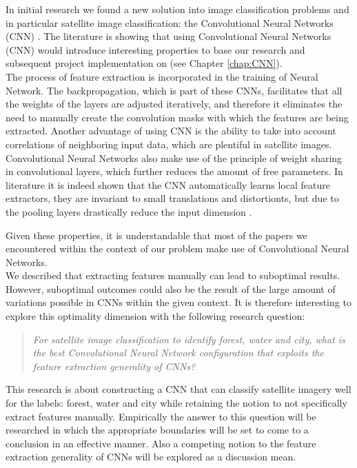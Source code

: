\documentclass[a4paper,onecolumn]{report}
\begin{document}
In initial research we found a new solution into image classification problems and in particular satellite image classification: the Convolutional Neural Networks (CNN) \cite{Hongsheng2014} \cite{Farabet2013}. The literature is showing that using Convolutional Neural Networks (CNN) would introduce interesting properties to base our research and subsequent project implementation on (see Chapter \ref{chap:CNN}).\\

The process of feature extraction is incorporated in the training of Neural Network. The backpropagation, which is part of these CNNs, facilitates that all the weights of the layers are adjusted iteratively, and therefore it eliminates the need to manually create the convolution masks with which the features are being extracted. Another advantage of using CNN is the ability to take into account correlations of neighboring input data, which are plentiful in satellite images. Convolutional Neural Networks also make use of the principle of weight sharing in convolutional layers, which further reduces the amount of free parameters. In literature it is indeed shown that the CNN automatically learns local feature extractors, they are invariant to small translations and distortionts, but due to the pooling layers drastically reduce the input dimension \cite{duffner2008face}.

Given these properties, it is understandable that most of the papers we encountered within the context of our problem make use of Convolutional Neural Networks.\\

We described that extracting features manually can lead to suboptimal results. However, suboptimal outcomes could also be the result of the large amount of variations possible in CNNs within the given context. It is therefore interesting to explore this optimality dimension with the following research question:

\begin{quote}
\emph{ \hspace{2ex} For satellite image classification to identify forest, water and city, what is the best Convolutional Neural Network configuration that exploits the feature extraction generality of CNNs?}
\end{quote}

This research is about constructing a CNN that can classify satellite imagery well for the labels: forest, water and city while retaining the notion to not specifically extract features manually. Empirically the answer to this question will be researched in which the appropriate boundaries will be set to come to a conclusion in an effective manner. Also a competing notion to the feature extraction generality of CNNs will be explored as a discussion mean.
\end{document}
